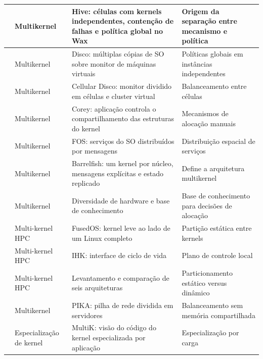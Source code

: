 \begin{small}
\begin{longtable}{p{3cm} p{2.5cm} p{4.75cm} p{3.75cm}}
        \citet{chapin1995hive} & Multikernel & Hive: células com kernels independentes, contenção de falhas e política global no Wax & Origem da separação entre mecanismo e política \\
        \midrule
        \citet{bugnion1997disco} & Multikernel & Disco: múltiplas cópias de SO sobre monitor de máquinas virtuais & Políticas globais em instâncias independentes \\
        \midrule
        \citet{govil2000cellular} & Multikernel & Cellular Disco: monitor dividido em células e cluster virtual & Balanceamento entre células \\
        \midrule
        \citet{boydwickizer2008corey} & Multikernel & Corey: aplicação controla o compartilhamento das estruturas do kernel & Mecanismos de alocação manuais \\
        \midrule
        \citet{wentzlaff2009fos} & Multikernel & FOS: serviços do SO distribuídos por mensagens & Distribuição espacial de serviços \\
        \midrule
        \citet{baumann2009multikernel} & Multikernel & Barrelfish: um kernel por núcleo, mensagens explícitas e estado replicado & Define a arquitetura multikernel \\
        \midrule
        \citet{schupbach2008diversity} & Multikernel & Diversidade de hardware e base de conhecimento & Base de conhecimento para decisões de alocação \\
        \midrule
        \citet{park2012fusedos} & Multi-kernel HPC & FusedOS: kernel leve ao lado de um Linux completo & Partição estática entre kernels \\
        \midrule
        \citet{shimosawa2014ihk} & Multi-kernel HPC & IHK: interface de ciclo de vida & Plano de controle local \\
        \midrule
        \citet{gerofi2016survey} & Multi-kernel HPC & Levantamento e comparação de seis arquiteturas & Particionamento estático versus dinâmico \\
        \midrule
        \citet{beckmann2014pika} & Multikernel & PIKA: pilha de rede dividida em servidores & Balanceamento sem memória compartilhada \\
        \midrule
        \citet{kuo2019multik} & Especialização de kernel & MultiK: visão do código do kernel especializada por aplicação & Especialização por carga \\
        \midrule


\end{longtable}
\end{small}
